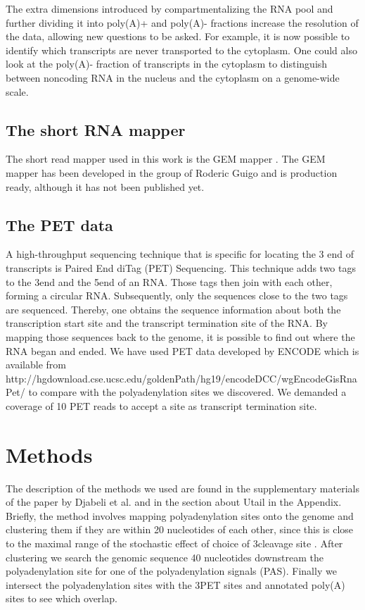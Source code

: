 The extra dimensions introduced by compartmentalizing the RNA pool and further
dividing it into poly(A)+ and poly(A)- fractions increase the resolution of the
data, allowing new questions to be asked. For example, it is now possible to
identify which transcripts are never transported to the cytoplasm. One could
also look at the poly(A)- fraction of transcripts in the cytoplasm to
distinguish between noncoding RNA in the nucleus and the cytoplasm on a
genome-wide scale.

\subsection{The short RNA mapper}
The short read mapper used in this work is the GEM mapper
\cite{ribeca_gem_2010}. The GEM mapper has been developed in the group of
Roderic Guigo and is production ready, although it has not been published yet.

\subsection{The PET data}
A high-throughput sequencing technique that is specific for locating the 3\p
end of transcripts is Paired End diTag (PET) Sequencing. This technique
adds two tags to the 3\p end and the 5\p end of an RNA. Those tags then join
with each other, forming a circular RNA. Subsequently, only the sequences close
to the two tags are sequenced. Thereby, one obtains the sequence information
about both the transcription start site and the transcript termination site of
the RNA. By mapping those sequences back to the genome, it is possible to find
out where the RNA began and ended. We have used PET data developed by ENCODE
which is available from
http://hgdownload.cse.ucsc.edu/goldenPath/hg19/encodeDCC/wgEncodeGisRnaPet/ to
compare with the polyadenylation sites we discovered. We demanded a coverage of
10 PET reads to accept a site as transcript termination site.

\section{Methods}
The description of the methods we used are found in the supplementary materials
of the paper by Djabeli et al. and in the section about Utail in the Appendix.
Briefly, the method involves mapping polyadenylation sites onto the genome and
clustering them if they are within 20 nucleotides of each other, since this is
close to the maximal range of the stochastic effect of choice of 3\p cleavage
site \cite{tian_large-scale_2005}. After clustering we search the genomic
sequence 40 nucleotides downstream the polyadenylation site for one of the
polyadenylation signals (PAS). Finally we intersect the polyadenylation sites
with the 3\p PET sites and annotated poly(A) sites to see which overlap.

